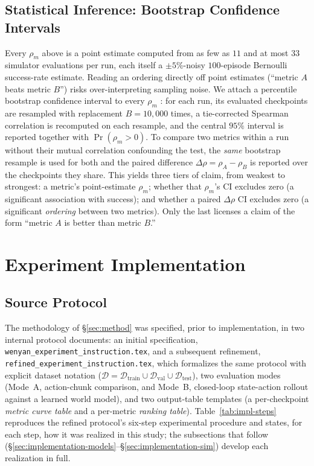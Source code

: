 \documentclass[11pt]{article}
\numberwithin{equation}{section}
\numberwithin{table}{section}
\numberwithin{figure}{section}
\begin{document}
\subsection{Statistical Inference: Bootstrap Confidence Intervals}
\label{sec:method-bootstrap}

Every $\rho_m$ above is a point estimate computed from as few as $11$ and at most $33$ simulator
evaluations per run, each itself a $\pm5\%$-noisy $100$-episode Bernoulli success-rate estimate. Reading
an ordering directly off point estimates (``metric $A$ beats metric $B$'') risks over-interpreting
sampling noise. We attach a percentile bootstrap confidence interval to every $\rho_m$
\cite{efron1979bootstrap,efron1993bootstrap}: for each run, its evaluated checkpoints are resampled with
replacement $B=10{,}000$ times, a tie-corrected Spearman correlation is recomputed on each resample, and
the central $95\%$ interval is reported together with $\Pr(\rho_m>0)$. To compare two metrics within a
run without their mutual correlation confounding the test, the \emph{same} bootstrap resample is used for
both and the paired difference $\Delta\rho=\rho_A-\rho_B$ is reported over the checkpoints they share.
This yields three tiers of claim, from weakest to strongest: a metric's point-estimate $\rho_m$; whether
that $\rho_m$'s CI excludes zero (a significant association with success); and whether a paired
$\Delta\rho$ CI excludes zero (a significant \emph{ordering} between two metrics). Only the last licenses
a claim of the form ``metric $A$ is better than metric $B$.''

\section{Experiment Implementation}
\label{sec:implementation}

\subsection{Source Protocol}
\label{sec:implementation-source}

The methodology of \S\ref{sec:method} was specified, prior to implementation, in two internal protocol
documents: an initial specification, \texttt{wenyan\_experiment\_instruction.tex}, and a subsequent
refinement, \texttt{refined\_experiment\_instruction.tex}, which formalizes the same protocol with
explicit dataset notation ($\mathcal D=\mathcal D_{\mathrm{train}}\cup\mathcal D_{\mathrm{val}}\cup
\mathcal D_{\mathrm{test}}$), two evaluation modes (Mode~A, action-chunk comparison, and Mode~B,
closed-loop state-action rollout against a learned world model), and two output-table templates (a
per-checkpoint \emph{metric curve table} and a per-metric \emph{ranking table}). Table~\ref{tab:impl-steps}
reproduces the refined protocol's six-step experimental procedure and states, for each step, how it was
realized in this study; the subsections that follow (\S\ref{sec:implementation-models}--\S\ref{sec:implementation-sim})
develop each realization in full.
\end{document}
